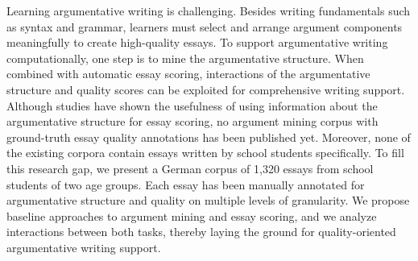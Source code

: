 Learning argumentative writing is challenging. Besides writing fundamentals such as syntax and grammar, learners must select and arrange argument components meaningfully to create high-quality essays. To support argumentative writing computationally, one step is to mine the argumentative structure. When combined with automatic essay scoring, interactions of the argumentative structure and quality scores can be exploited for comprehensive writing support. Although studies have shown the usefulness of using information about the argumentative structure for essay scoring, no argument mining corpus with ground-truth essay quality annotations has been published yet. Moreover, none of the existing corpora contain essays written by school students specifically. To fill this research gap, we present a German corpus of 1,320 essays from school students of two age groups. Each essay has been manually annotated for argumentative structure and  quality on multiple levels of granularity. We propose baseline approaches to argument mining and essay scoring, and we analyze interactions between both tasks, thereby laying the ground for quality-oriented argumentative writing support.